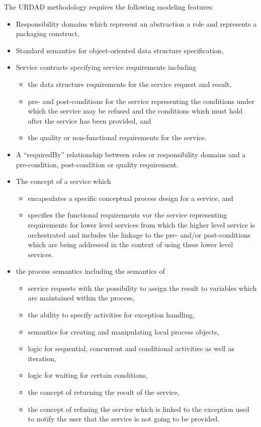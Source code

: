 The URDAD methodology requires the following modeling features:
\begin{itemize}
  \item Responsibility domains which represent an abstraction a role and represents a packaging construct,
  \item Standard semantics for object-oriented data structure specification,
  \item Service contracts specifying service requirements including
    \begin{itemize}
      \item the data structure requirements for the service request and result,
      \item pre- and post-conditions for the service representing the conditions under which the service may be refused and the conditions which must hold after the service has been provided, and
      \item the quality or non-functional requirements for the service.
     \end{itemize}
  \item A ``requiredBy'' relationship between roles or responsibility domains and a pre-condition, post-condition or quality requirement.
  \item The concept of a service which 
    \begin{itemize}
      \item encapsulates a specific conceptual process design for a service, and 
      \item specifies the functional requirements vor the service representing requirements for lower level services from which the higher level service is orchestrated and includes the linkage to the pre- and/or post-conditions which are being addressed in the context of using these lower level services.
    \end{itemize}
  \item the process semantics including the semantics of 
    \begin{itemize}
      \item service requests with the possibility to assign the result to variables which are maintained within the process,
      \item the ability to specify activities for exception handling,
      \item semantics for creating and manipulating local process objects,
      \item logic for sequential, concurrent and conditional activities as well as iteration,
      \item logic for waiting for certain conditions,
      \item the concept of returning the result of the service,
      \item the concept of refusing the service which is linked to the exception used to notify the user that the service is not going to be provided.
    \end{itemize}
\end{itemize}

